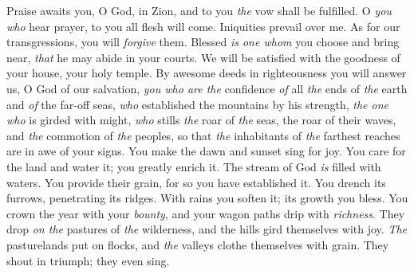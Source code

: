 \begin{biblechapter} %
 Praise awaits you, O God, in Zion, 
and to you \textit{the} vow shall be fulfilled.
\verse O \textit{you who} hear prayer, 
to you all flesh will come.
\verse Iniquities prevail over me. 
As for our transgressions, you will \textit{forgive} them.
\verse Blessed \textit{is one whom} you choose and bring near, 
\textit{that} he may abide in your courts. 
We will be satisfied with the goodness of your house, 
your holy temple.
\verse By awesome deeds in righteousness you will answer us, 
O God of our salvation, 
\textit{you who are the} confidence \textit{of} all \textit{the} ends of \textit{the} earth 
and \textit{of} the far-off seas,
\verse \textit{who} established the mountains by his strength, 
\textit{the one who} is girded with might,
\verse \textit{who} stills \textit{the} roar of \textit{the} seas, 
the roar of their waves, 
and \textit{the} commotion of \textit{the} peoples,
\verse so that \textit{the} inhabitants of \textit{the} farthest reaches are in awe of your signs. 
You make the dawn and sunset sing for joy.
\verse You care for the land and water it; 
you greatly enrich it. 
The stream of God \textit{is} filled with waters. 
You provide their grain, 
for so you have established it.
\verse You drench its furrows, 
penetrating its ridges. 
With rains you soften it; 
its growth you bless.
\verse You crown the year with your \textit{bounty}, 
and your wagon paths drip with \textit{richness}.
\verse They drop \textit{on the} pastures of \textit{the} wilderness, 
and the hills gird themselves with joy.
\verse \textit{The} pasturelands put on flocks, 
and \textit{the} valleys clothe themselves with grain. 
They shout in triumph; 
they even sing.
\end{biblechapter}

